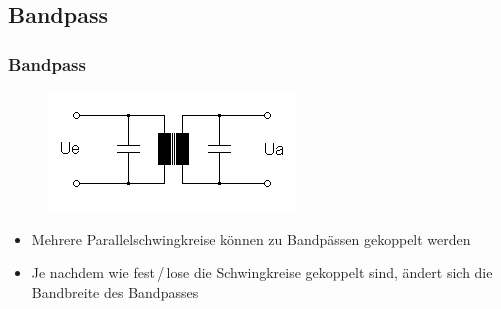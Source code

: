 \subsection*{Bandpass}
\begin{frame}
  \frametitle{Bandpass}
  \begin{center}
    \begin{figure}
      \includegraphics[width=\textwidth,height=.5\textheight,keepaspectratio]{a04/BandpassSpulen.png}
    \end{figure}
  \end{center}
  \begin{itemize}
    \item Mehrere Parallelschwingkreise können zu Bandpässen gekoppelt werden
    \item Je nachdem wie fest\,/\,lose die Schwingkreise gekoppelt sind, ändert sich die Bandbreite des Bandpasses
  \end{itemize}
\end{frame}

